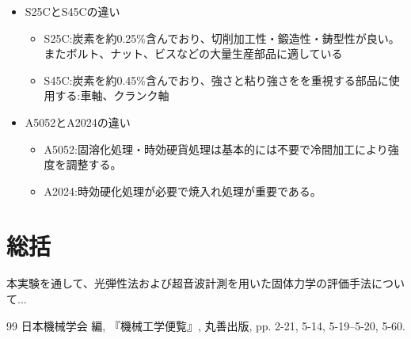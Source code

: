 \documentclass[uplatex,dvipdfmx,titlepage]{jsarticle}
\begin{document}
\begin{itemize}
    \item S25CとS45Cの違い
    \begin{itemize}
        \item S25C:炭素を約0.25\%含んでおり、切削加工性・鍛造性・鋳型性が良い。またボルト、ナット、ビスなどの大量生産部品に適している
        \item S45C:炭素を約0.45\%含んでおり、強さと粘り強さをを重視する部品に使用する:車軸、クランク軸
    \end{itemize}
    \item A5052とA2024の違い
    \begin{itemize}
    \item A5052:固溶化処理・時効硬貨処理は基本的には不要で冷間加工により強度を調整する。
    \item A2024:時効硬化処理が必要で焼入れ処理が重要である。
    \end{itemize}
\end{itemize}

\section{総括}
本実験を通して、光弾性法および超音波計測を用いた固体力学の評価手法について...

\begin{thebibliography}{99}
     日本機械学会 編, 『機械工学便覧』, 丸善出版, pp. 2-21, 5-14, 5-19--5-20, 5-60.
\end{thebibliography}
\end{document}
